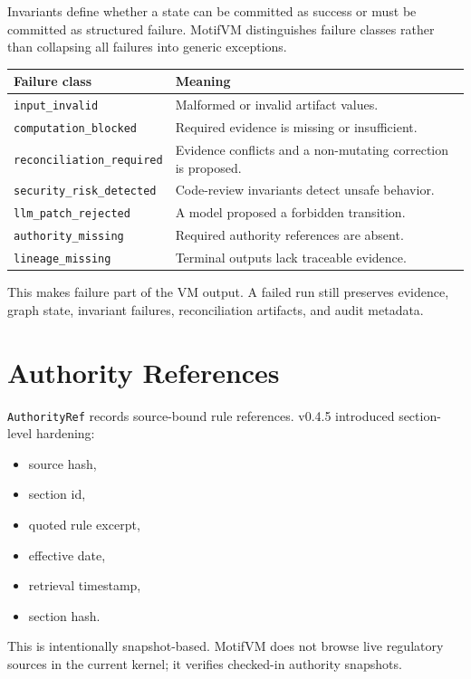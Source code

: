 \documentclass[11pt]{article}
\begin{document}
Invariants define whether a state can be committed as success or must be committed as structured failure. MotifVM distinguishes failure classes rather than collapsing all failures into generic exceptions.

\begin{center}
\begin{tabular}{ll}
\toprule
\textbf{Failure class} & \textbf{Meaning} \\
\midrule
\texttt{input\_invalid} & Malformed or invalid artifact values. \\
\texttt{computation\_blocked} & Required evidence is missing or insufficient. \\
\texttt{reconciliation\_required} & Evidence conflicts and a non-mutating correction is proposed. \\
\texttt{security\_risk\_detected} & Code-review invariants detect unsafe behavior. \\
\texttt{llm\_patch\_rejected} & A model proposed a forbidden transition. \\
\texttt{authority\_missing} & Required authority references are absent. \\
\texttt{lineage\_missing} & Terminal outputs lack traceable evidence. \\
\bottomrule
\end{tabular}
\end{center}

This makes failure part of the VM output. A failed run still preserves evidence, graph state, invariant failures, reconciliation artifacts, and audit metadata.

\section{Authority References}

\texttt{AuthorityRef} records source-bound rule references. v0.4.5 introduced section-level hardening:

\begin{itemize}[leftmargin=1.5em]
  \item source hash,
  \item section id,
  \item quoted rule excerpt,
  \item effective date,
  \item retrieval timestamp,
  \item section hash.
\end{itemize}

This is intentionally snapshot-based. MotifVM does not browse live regulatory sources in the current kernel; it verifies checked-in authority snapshots.
\end{document}
